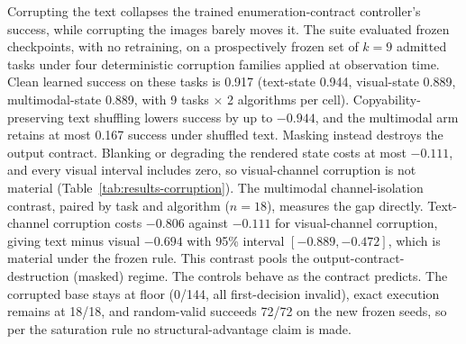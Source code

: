 Corrupting the text collapses the trained enumeration-contract controller's success, while corrupting the images barely moves it. The suite evaluated frozen checkpoints, with no retraining, on a prospectively frozen set of $k{=}9$ admitted tasks under four deterministic corruption families applied at observation time. Clean learned success on these tasks is 0.917 (text-state 0.944, visual-state 0.889, multimodal-state 0.889, with 9 tasks $\times$ 2 algorithms per cell). Copyability-preserving text shuffling lowers success by up to $-0.944$, and the multimodal arm retains at most 0.167 success under shuffled text. Masking instead destroys the output contract. Blanking or degrading the rendered state costs at most $-0.111$, and every visual interval includes zero, so visual-channel corruption is not material (Table~\ref{tab:results-corruption}). The multimodal channel-isolation contrast, paired by task and algorithm ($n{=}18$), measures the gap directly. Text-channel corruption costs $-0.806$ against $-0.111$ for visual-channel corruption, giving text minus visual $-0.694$ with 95\% interval $[-0.889, -0.472]$, which is material under the frozen rule. This contrast pools the output-contract-destruction (masked) regime. The controls behave as the contract predicts. The corrupted base stays at floor (0/144, all first-decision invalid), exact execution remains at 18/18, and random-valid succeeds 72/72 on the new frozen seeds, so per the saturation rule no structural-advantage claim is made.

